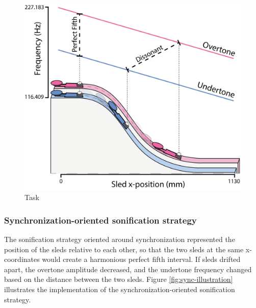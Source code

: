 \documentclass[10pt,a4paper,onecolumn]{article}
\begin{document}
\begin{figure}[h]

{\centering \includegraphics[width=1\linewidth]{figures/task_sonif_illustration} 

}

\caption{Task}\label{fig:task-illustration}
\end{figure}

\hypertarget{synchronization-oriented-sonification-strategy}{%
\subsubsection{Synchronization-oriented sonification strategy}\label{synchronization-oriented-sonification-strategy}}

The sonification strategy oriented around synchronization represented the position of the sleds relative to each other, so that the two sleds at the same x-coordinates would create a harmonious perfect fifth interval. If sleds drifted apart, the overtone amplitude decreased, and the undertone frequency changed based on the distance between the two sleds. Figure \ref{fig:sync-illustration} illustrates the implementation of the synchronization-oriented sonification strategy.
\end{document}
